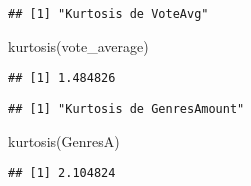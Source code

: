 \documentclass[
]{article}
\newenvironment{Shaded}{\begin{snugshade}}{\end{snugshade}}
\newcommand{\CommentTok}[1]{\textcolor[rgb]{0.56,0.35,0.01}{\textit{#1}}}
\newcommand{\FunctionTok}[1]{\textcolor[rgb]{0.00,0.00,0.00}{#1}}
\newcommand{\NormalTok}[1]{#1}
\newcommand{\OtherTok}[1]{\textcolor[rgb]{0.56,0.35,0.01}{#1}}
\newcommand{\SpecialCharTok}[1]{\textcolor[rgb]{0.00,0.00,0.00}{#1}}
\newcommand{\StringTok}[1]{\textcolor[rgb]{0.31,0.60,0.02}{#1}}
\begin{document}
\begin{Shaded}
\end{Shaded}

\begin{verbatim}
## [1] "Kurtosis de VoteAvg"
\end{verbatim}

\begin{Shaded}
\begin{Highlighting}[]
\FunctionTok{kurtosis}\NormalTok{(vote\_average)}
\end{Highlighting}
\end{Shaded}

\begin{verbatim}
## [1] 1.484826
\end{verbatim}

\begin{Shaded}
\end{Shaded}

\begin{verbatim}
## [1] "Kurtosis de GenresAmount"
\end{verbatim}

\begin{Shaded}
\begin{Highlighting}[]
\FunctionTok{kurtosis}\NormalTok{(GenresA)}
\end{Highlighting}
\end{Shaded}

\begin{verbatim}
## [1] 2.104824
\end{verbatim}

\begin{Shaded}
\end{Shaded}
\end{document}
